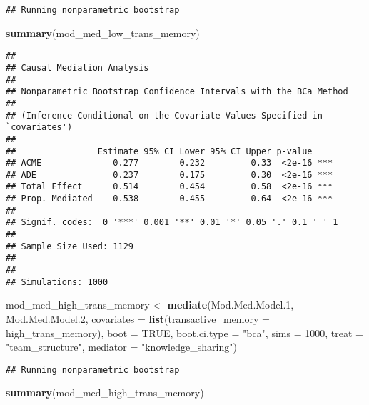 \documentclass[]{article}
\newenvironment{Shaded}{\begin{snugshade}}{\end{snugshade}}
\newcommand{\DataTypeTok}[1]{\textcolor[rgb]{0.13,0.29,0.53}{#1}}
\newcommand{\DecValTok}[1]{\textcolor[rgb]{0.00,0.00,0.81}{#1}}
\newcommand{\FloatTok}[1]{\textcolor[rgb]{0.00,0.00,0.81}{#1}}
\newcommand{\KeywordTok}[1]{\textcolor[rgb]{0.13,0.29,0.53}{\textbf{#1}}}
\newcommand{\NormalTok}[1]{#1}
\newcommand{\OtherTok}[1]{\textcolor[rgb]{0.56,0.35,0.01}{#1}}
\newcommand{\StringTok}[1]{\textcolor[rgb]{0.31,0.60,0.02}{#1}}
\begin{document}
\begin{verbatim}
## Running nonparametric bootstrap
\end{verbatim}

\begin{Shaded}
\begin{Highlighting}[]
\KeywordTok{summary}\NormalTok{(mod_med_low_trans_memory)}
\end{Highlighting}
\end{Shaded}

\begin{verbatim}
## 
## Causal Mediation Analysis 
## 
## Nonparametric Bootstrap Confidence Intervals with the BCa Method
## 
## (Inference Conditional on the Covariate Values Specified in `covariates')
## 
##                Estimate 95% CI Lower 95% CI Upper p-value    
## ACME              0.277        0.232         0.33  <2e-16 ***
## ADE               0.237        0.175         0.30  <2e-16 ***
## Total Effect      0.514        0.454         0.58  <2e-16 ***
## Prop. Mediated    0.538        0.455         0.64  <2e-16 ***
## ---
## Signif. codes:  0 '***' 0.001 '**' 0.01 '*' 0.05 '.' 0.1 ' ' 1
## 
## Sample Size Used: 1129 
## 
## 
## Simulations: 1000
\end{verbatim}

\begin{Shaded}
\begin{Highlighting}[]
\NormalTok{mod_med_high_trans_memory <-}\StringTok{ }\KeywordTok{mediate}\NormalTok{(Mod.Med.Model}\FloatTok{.1}\NormalTok{, Mod.Med.Model}\FloatTok{.2}\NormalTok{,}
                             \DataTypeTok{covariates =} \KeywordTok{list}\NormalTok{(}\DataTypeTok{transactive_memory =}\NormalTok{ high_trans_memory), }
                             \DataTypeTok{boot =} \OtherTok{TRUE}\NormalTok{,}
                             \DataTypeTok{boot.ci.type =} \StringTok{"bca"}\NormalTok{,}
                             \DataTypeTok{sims =} \DecValTok{1000}\NormalTok{, }\DataTypeTok{treat =} \StringTok{"team_structure"}\NormalTok{, }
                             \DataTypeTok{mediator =} \StringTok{"knowledge_sharing"}\NormalTok{)}
\end{Highlighting}
\end{Shaded}

\begin{verbatim}
## Running nonparametric bootstrap
\end{verbatim}

\begin{Shaded}
\begin{Highlighting}[]
\KeywordTok{summary}\NormalTok{(mod_med_high_trans_memory)}
\end{Highlighting}
\end{Shaded}
\end{document}

